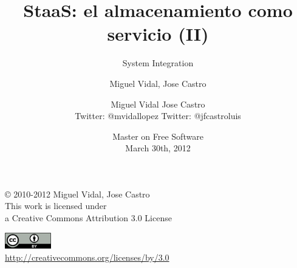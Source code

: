 \documentclass{beamer}
\begin{document}
\title{StaaS: el almacenamiento como servicio (II)}
\subtitle{System Integration}
\author{Miguel Vidal, Jose Castro} 
\date{\footnotesize{Master on Free Software \\ March 30th, 2012}}
\author{Miguel Vidal \hspace{1cm} Jose Castro \\
\hspace{0.5mm} {\tiny Twitter: @mvidallopez \hspace{1.1cm}Twitter: @jfcastroluis}
}



\begin{frame}
  \vspace{2cm}
  \begin{flushright}
    {\small \copyright{} 2010-2012 Miguel Vidal, Jose Castro} \\
    \medskip
    {\scriptsize This work is licensed under \\ a Creative Commons Attribution 3.0 License}
  \end{flushright}
  \begin{flushright}
    \href{http://creativecommons.org/licenses/by/3.0/es}{\includegraphics[width=2cm]{format/cc-by.png}} \\
    {\tiny \url{http://creativecommons.org/licenses/by/3.0}}
  \end{flushright}
\end{frame}%

\usebackgroundtemplate{}

\end{document}
